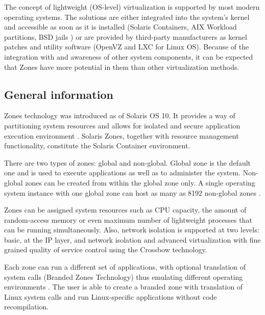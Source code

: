 \documentclass[11pt]{book}
\begin{document}

      The concept of lightweight (OS-level) virtualization is supported by most modern operating systems. The solutions
      are either integrated into the system's kernel and accessible as soon as it is installed (Solaris Containers, AIX
      Workload partitions, BSD jails \cite{kamp}) or are provided by third-party manufacturers as kernel patches and
      utility software (OpenVZ and LXC for Linux OS). Because of the integration with and awareness of other system
      components, it can be expected that Zones have more potential in them than other virtualization methods.


      \subsection{General information}
      \label{sub:}

        Zones technology was introduced as of Solaris OS 10. It provides a way of partitioning system resources and
        allows for isolated and secure application execution environment \cite{sag}. Solaris Zones, together with
        resource management functionality, constitute the Solaris Container environment.

        There are two types of zones: global and non-global. Global zone is the default one and is used to execute
        applications as well as to administer the system. Non-global zones can be created from within the global zone
        only. A single operating system instance with one global zone can host as many as 8192 non-global zones
        \cite{sag}.

        Zones can be assigned system resources such as CPU capacity, the amount of random-access memory or even maximum
        number of lightweight processes that can be running simultaneously. Also, network isolation is supported at two
        levels: basic, at the IP layer, and network isolation and advanced virtualization with fine grained quality of
        service control using the Crossbow technology.

        Each zone can run a different set of applications, with optional translation of system calls (Branded Zones
        Technology) thus emulating different operating environments \cite{sag}. The user is able to create a branded
        zone with translation of Linux system calls and run Linux-specific applications without code recompilation.
\end{document}
